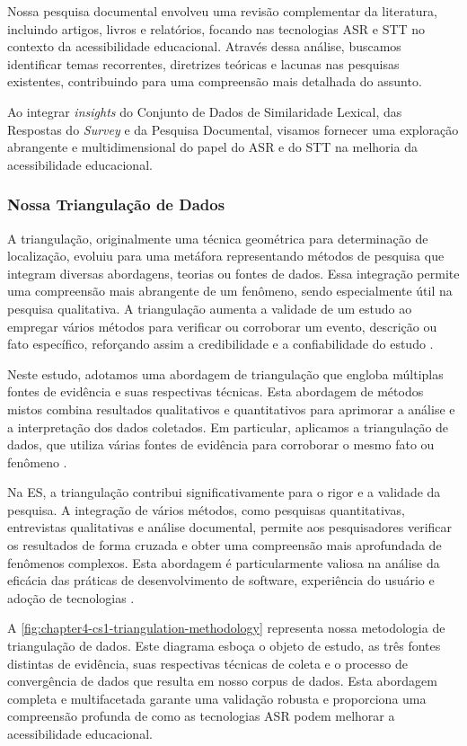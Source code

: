 Nossa pesquisa documental envolveu uma revisão complementar da literatura, incluindo artigos, livros e relatórios, focando nas tecnologias ASR e STT no contexto da acessibilidade educacional. Através dessa análise, buscamos identificar temas recorrentes, diretrizes teóricas e lacunas nas pesquisas existentes, contribuindo para uma compreensão mais detalhada do assunto.

Ao integrar \textit{insights} do Conjunto de Dados de Similaridade Lexical, das Respostas do \textit{Survey} e da Pesquisa Documental, visamos fornecer uma exploração abrangente e multidimensional do papel do ASR e do STT na melhoria da acessibilidade educacional.

\subsubsection{Nossa Triangulação de Dados}

A triangulação, originalmente uma técnica geométrica para determinação de localização, evoluiu para uma metáfora representando métodos de pesquisa que integram diversas abordagens, teorias ou fontes de dados. Essa integração permite uma compreensão mais abrangente de um fenômeno, sendo especialmente útil na pesquisa qualitativa. A triangulação aumenta a validade de um estudo ao empregar vários métodos para verificar ou corroborar um evento, descrição ou fato específico, reforçando assim a credibilidade e a confiabilidade do estudo \cite{Farquhar2020, Yin2015}.

Neste estudo, adotamos uma abordagem de triangulação que engloba múltiplas fontes de evidência e suas respectivas técnicas. Esta abordagem de métodos mistos combina resultados qualitativos e quantitativos para aprimorar a análise e a interpretação dos dados coletados. Em particular, aplicamos a triangulação de dados, que utiliza várias fontes de evidência para corroborar o mesmo fato ou fenômeno \cite{Yin2015}.

Na ES, a triangulação contribui significativamente para o rigor e a validade da pesquisa. A integração de vários métodos, como pesquisas quantitativas, entrevistas qualitativas e análise documental, permite aos pesquisadores verificar os resultados de forma cruzada e obter uma compreensão mais aprofundada de fenômenos complexos. Esta abordagem é particularmente valiosa na análise da eficácia das práticas de desenvolvimento de software, experiência do usuário e adoção de tecnologias \cite{Runeson2009}.

A \autoref{fig:chapter4-cs1-triangulation-methodology} representa nossa metodologia de triangulação de dados. Este diagrama esboça o objeto de estudo, as três fontes distintas de evidência, suas respectivas técnicas de coleta e o processo de convergência de dados que resulta em nosso corpus de dados. Esta abordagem completa e multifacetada garante uma validação robusta e proporciona uma compreensão profunda de como as tecnologias ASR podem melhorar a acessibilidade educacional.

